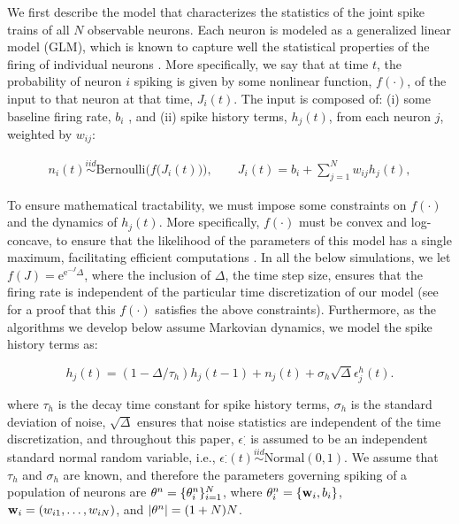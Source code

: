 We first describe the model that characterizes the statistics of the joint spike trains of all $N$ observable neurons.  Each neuron is modeled as a generalized linear model (GLM), which is known to capture well the statistical properties of the firing of individual neurons \cite{PILL07, PAN03d, Wu07, Rigat06, OKA05}.  More specifically, we say that at time $t$, the probability of neuron $i$ spiking is given by some nonlinear function, $f(\cdot)$, of the input to that neuron at that time, $J_i(t)$.  The input is composed of: (i) some baseline firing rate, $b_i$%
, and (ii) spike history terms, $h_j(t)$, from each neuron $j$, weighted by $w_{ij}$:

\begin{equation}\label{eqn:glm:definition}
\begin{array}{l}
n_i(t)\overset{iid}{\sim} \text{Bernoulli}\big(f\big(J_i(t)\big)\big), \qquad %
J_i(t)=b_i+\sum \limits_{j=1}^{N}  w_{ij} h_{j}(t), %
\end{array}
\end{equation}

\noindent To ensure mathematical tractability, we must impose some constraints on $f(\cdot)$ and the dynamics of $h_j(t)$.  More specifically, $f(\cdot)$ must be convex and log-concave, to ensure that the likelihood of the parameters of this model has a single maximum, facilitating efficient computations \cite{PAN03d}.  In all the below simulations, we let $f(J)=\text{e}^{\text{e}^{-J}\Delta}$, where the inclusion of $\Delta$, the time step size, ensures that the firing rate is independent of the particular time discretization of our model (see \cite{??} for a proof that this $f(\cdot)$ satisfies the above constraints).  Furthermore, as the algorithms we develop below assume Markovian dynamics, we model the spike history terms as:

\begin{equation}
h_j(t) = (1- \Delta/\tau_h) h_j(t-1) +n_j(t) + \sigma_h \sqrt{\Delta} \epsilon^h_j(t).
\end{equation}

\noindent where $\tau_h$ is the decay time constant for spike history terms, $\sigma_h$ is the standard deviation of noise, $\sqrt{\Delta}$ ensures that noise statistics are independent of the time discretization, and throughout this paper, $\epsilon_\cdot^\cdot$ is assumed to be an independent standard normal random variable, i.e., $\epsilon_{\cdot}^{\cdot}(t) \overset{iid}{\sim} \text{Normal}(0,1)$.  We assume that $\tau_h$ and $\sigma_h$ are known, and therefore the parameters governing spiking of a population of neurons are $\mathbf{\theta}^n=\{\mathbf{\theta}^n_i\}_{i=1}^N$, where $\mathbf{\theta}^n_i=\{\mathbf{w}_i, b_i\}$,  $\mathbf{w}_i=(w_{i1},\ldots, w_{iN})$, and $|\mathbf{\theta}^n|=(1+N) N$. 

